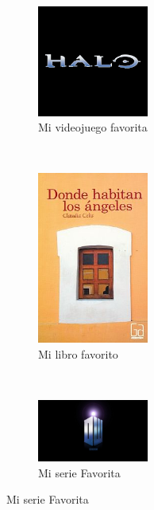 \begin{figure}[h!]
  \begin{subfigure}{0.33\textwidth}
    \centering
    \includegraphics[width=0.4\textwidth]{317100664/juegof.png}
    \caption{Mi videojuego favorita}
    \label{fig:videojuego favorito}
  \end{subfigure}
  ~
  \begin{subfigure}{0.33\textwidth}
    \centering
    \includegraphics[width=0.4\textwidth]{317100664/librof.jpg}
    \caption{Mi libro favorito}
    \label{fig:libro favorito}    
  \end{subfigure}
  ~
  \begin{subfigure}{0.33\textwidth}
    \centering
    \includegraphics[width=0.4\textwidth]{317100664/dw1.jpg}
    \caption{Mi serie Favorita}
    \label{fig:serie favorita}
  \end{subfigure}
\end{figure}
